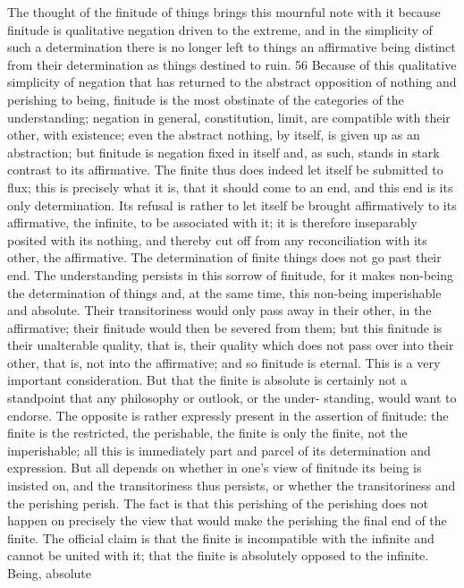 The thought of the finitude of things brings this mournful note with it
because finitude is qualitative negation driven to the extreme, and in the
simplicity of such a determination there is no longer left to things an
affirmative being distinct from their determination as things destined to
ruin. 56 Because of this qualitative simplicity of negation that has returned
to the abstract opposition of nothing and perishing to being, finitude
is the most obstinate of the categories of the understanding; negation in
general, constitution, limit, are compatible with their other, with existence;
even the abstract nothing, by itself, is given up as an abstraction; but
finitude is negation fixed in itself and, as such, stands in stark contrast to its
affirmative. The finite thus does indeed let itself be submitted to flux; this
is precisely what it is, that it should come to an end, and this end is its only
determination. Its refusal is rather to let itself be brought affirmatively to its
affirmative, the infinite, to be associated with it; it is therefore inseparably
posited with its nothing, and thereby cut off from any reconciliation with
its other, the affirmative. The determination of finite things does not go
past their end. The understanding persists in this sorrow of finitude, for
it makes non-being the determination of things and, at the same time,
this non-being imperishable and absolute. Their transitoriness would only
pass away in their other, in the affirmative; their finitude would then be
severed from them; but this finitude is their unalterable quality, that is,
their quality which does not pass over into their other, that is, not into the
affirmative; and so finitude is eternal.
This is a very important consideration. But that the finite is absolute is
certainly not a standpoint that any philosophy or outlook, or the under-
standing, would want to endorse. The opposite is rather expressly present
in the assertion of finitude: the finite is the restricted, the perishable, the
finite is only the finite, not the imperishable; all this is immediately part
and parcel of its determination and expression. But all depends on whether
in one’s view of finitude its being is insisted on, and the transitoriness thus
persists, or whether the transitoriness and the perishing perish. The fact is
that this perishing of the perishing does not happen on precisely the view
that would make the perishing the final end of the finite. The official claim
is that the finite is incompatible with the infinite and cannot be united
with it; that the finite is absolutely opposed to the infinite. Being, absolute
